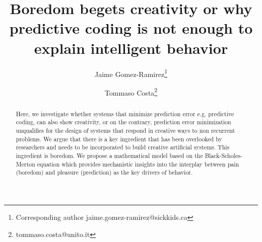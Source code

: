 \documentclass[11pt, onecolumn]{article}
\begin{document}
\title{Boredom begets creativity or why predictive coding is not enough to explain intelligent behavior}

\author[1]{Jaime Gomez-Ramirez\thanks{Corresponding author \hspace{0.6cm} jaime.gomez-ramirez@sickkids.ca}}
\author[2]{Tommaso Costa\thanks{\hspace{0.6cm} tommaso.costa@unito.it}}

\date{}
\maketitle

\begin{abstract}
Here, we investigate whether systems that minimize prediction error e.g. predictive coding, can also show creativity, or on the contrary, prediction error minimization unqualifies for the design of systems that respond in creative ways to non recurrent problems. 
We argue that there is a key ingredient that has been overlooked by researchers and needs to be incorporated to build creative artificial systems. This ingredient is boredom. We propose a mathematical model based on the Black-Scholes-Merton equation which provides mechanistic insights into the interplay between pain (boredom) and pleasure (prediction) as the key drivers of behavior.
\end{abstract}
\end{document}

